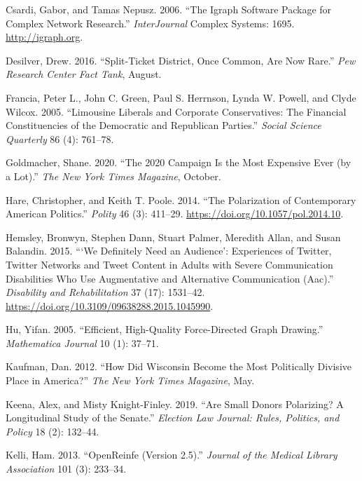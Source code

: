 \documentclass[12pt,]{article}
\begin{document}
\leavevmode\hypertarget{ref-igraph}{}%
Csardi, Gabor, and Tamas Nepusz. 2006. ``The Igraph Software Package for
Complex Network Research.'' \emph{InterJournal} Complex Systems: 1695.
\url{http://igraph.org}.

\leavevmode\hypertarget{ref-desilver2016}{}%
Desilver, Drew. 2016. ``Split-Ticket District, Once Common, Are Now
Rare.'' \emph{Pew Research Center Fact Tank}, August.

\leavevmode\hypertarget{ref-francia2005}{}%
Francia, Peter L., John C. Green, Paul S. Herrnson, Lynda W. Powell, and
Clyde Wilcox. 2005. ``Limousine Liberals and Corporate Conservatives:
The Financial Constituencies of the Democratic and Republican Parties.''
\emph{Social Science Quarterly} 86 (4): 761--78.

\leavevmode\hypertarget{ref-goldmacher2020}{}%
Goldmacher, Shane. 2020. ``The 2020 Campaign Is the Most Expensive Ever
(by a Lot).'' \emph{The New York Times Magazine}, October.

\leavevmode\hypertarget{ref-hare2014}{}%
Hare, Christopher, and Keith T. Poole. 2014. ``The Polarization of
Contemporary American Politics.'' \emph{Polity} 46 (3): 411--29.
\url{https://doi.org/10.1057/pol.2014.10}.

\leavevmode\hypertarget{ref-hemsley2015}{}%
Hemsley, Bronwyn, Stephen Dann, Stuart Palmer, Meredith Allan, and Susan
Balandin. 2015. ```We Definitely Need an Audience': Experiences of
Twitter, Twitter Networks and Tweet Content in Adults with Severe
Communication Disabilities Who Use Augmentative and Alternative
Communication (Aac).'' \emph{Disability and Rehabilitation} 37 (17):
1531--42. \url{https://doi.org/10.3109/09638288.2015.1045990}.

\leavevmode\hypertarget{ref-yifanhu}{}%
Hu, Yifan. 2005. ``Efficient, High-Quality Force-Directed Graph
Drawing.'' \emph{Mathematica Journal} 10 (1): 37--71.

\leavevmode\hypertarget{ref-kaufman2012}{}%
Kaufman, Dan. 2012. ``How Did Wisconsin Become the Most Politically
Divisive Place in America?'' \emph{The New York Times Magazine}, May.

\leavevmode\hypertarget{ref-keena2019}{}%
Keena, Alex, and Misty Knight-Finley. 2019. ``Are Small Donors
Polarizing? A Longitudinal Study of the Senate.'' \emph{Election Law
Journal: Rules, Politics, and Policy} 18 (2): 132--44.

\leavevmode\hypertarget{ref-openrefine}{}%
Kelli, Ham. 2013. ``OpenReinfe (Version 2.5).'' \emph{Journal of the
Medical Library Association} 101 (3): 233--34.
\end{document}
